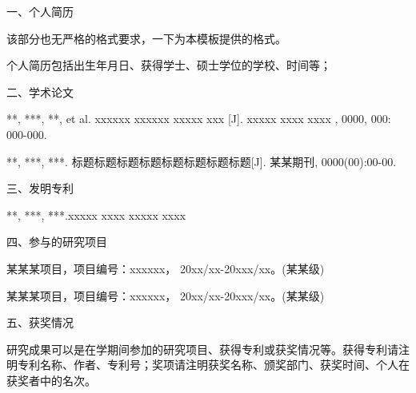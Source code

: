 \begin{achievements}
	
\begin{flushleft}
	\sihao\heiti
	一、个人简历
	\vspace{6pt}
\end{flushleft}

该部分也无严格的格式要求，一下为本模板提供的格式。
	
个人简历包括出生年月日、获得学士、硕士学位的学校、时间等；

\begin{flushleft}
	\banxiaosi\heiti
	\vspace{12pt}
	二、学术论文
	\vspace{6pt}
\end{flushleft}


\begin{enumerate}[label={[}\arabic*{]}]
	\item ***, ***, **, et al. xxxxxx xxxxxx xxxxx xxx [J]. xxxxx xxxx xxxx , 0000, 000: 000-000.
	\item ***, ***, ***. 标题标题标题标题标题标题标题标题[J]. 某某期刊, 0000(00):00-00.
\end{enumerate}

\begin{flushleft}
	\banxiaosi\heiti
	\vspace{12pt}
	三、发明专利
	\vspace{6pt}
\end{flushleft}

\begin{enumerate}[label={[}\arabic*{]}]
	\item ***, ***, ***.xxxxx xxxx xxxxx xxxx
\end{enumerate}


\begin{flushleft}
	\banxiaosi\heiti
	\vspace{12pt}
	四、参与的研究项目
	\vspace{6pt}
\end{flushleft}

\begin{enumerate}[label={[}\arabic*{]}]
	\item 某某某项目，项目编号：xxxxxx，
	20xx/xx-20xxx/xx。(某某级) 
	\item 某某某项目，项目编号：xxxxxx，
	20xx/xx-20xxx/xx。(某某级)
\end{enumerate}

\begin{flushleft}
	\banxiaosi\heiti
	\vspace{12pt}
	五、获奖情况
	\vspace{6pt}
\end{flushleft}

\begin{enumerate}[label={[}\arabic*{]}]
	\item 研究成果可以是在学期间参加的研究项目、获得专利或获奖情况等。获得专利请注明专利名称、作者、专利号；奖项请注明获奖名称、颁奖部门、获奖时间、个人在获奖者中的名次。
\end{enumerate}

\end{achievements}